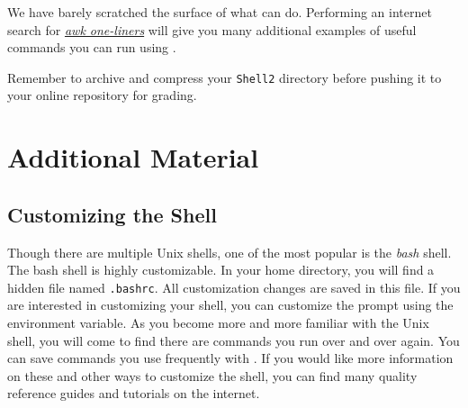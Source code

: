 \begin{comment}
\begin{problem}
The \texttt{people\_info.txt} file contains a list of info about specific people.
Each person has a gender, occupation, name, and age.
Listed in that order.

The formatting in this file is a little different, because each piece of info is separated by a comma instead of a space.
Using what you learned in the previous discussion, as an awk command to format the data as follows; \emph{gender,age,name,occupation}, with the gender left justified, the age right, the name left, and the occupation printed to its full length. 
Note that the names in this file are no longer than six letters.
Write the results of your command to a different file called \texttt{people\_formatted.txt}.
\\(Hint: To change the field separator change the \texttt{FS $=$} part of the command. )
\end{problem}
\end{comment}

We have barely scratched the surface of what  can do.
Performing an internet search for \href{https://www.google.com/search?q=awk+one-liners&oq=awk+one-liners&aqs=chrome..69i57j0l7.3924j0j7&sourceid=chrome&ie=UTF-8}{\emph{awk one-liners}} will give you many additional examples of useful commands you can run using .

\begin{info}
Remember to archive and compress your \texttt{Shell2} directory before pushing it to your online repository for grading.
\end{info}

\newpage

\section*{Additional Material} %

\subsection*{Customizing the Shell} %
Though there are multiple Unix shells, one of the most popular is the \emph{bash} shell.
The bash shell is highly customizable.
In your home directory, you will find a hidden file named \texttt{.bashrc}.
All customization changes are saved in this file.
If you are interested in customizing your shell, you can customize the prompt using the  environment variable.
As you become more and more familiar with the Unix shell, you will come to find there are commands you run over and over again.
You can save commands you use frequently with .
If you would like more information on these and other ways to customize the shell, you can find many quality reference guides and tutorials on the internet.

